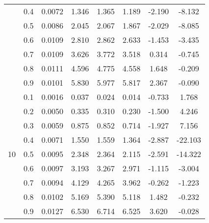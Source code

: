 \documentclass[11pt,a4paper]{report}
\begin{document}
\begin{longtable}{ | c | c || c | c | c | c | c | c | }
 & 0.4 & 0.0072 & 1.346 & 1.365 & 1.189 & -2.190 & -8.132 \\
 & 0.5 & 0.0086 & 2.045 & 2.067 & 1.867 & -2.029 & -8.085 \\
 & 0.6 & 0.0109 & 2.810 & 2.862 & 2.633 & -1.453 & -3.435 \\
 & 0.7 & 0.0109 & 3.626 & 3.772 & 3.518 & 0.314 & -0.745 \\
 & 0.8 & 0.0111 & 4.596 & 4.775 & 4.558 & 1.648 & -0.209 \\
 & 0.9 & 0.0101 & 5.830 & 5.977 & 5.817 & 2.367 & -0.090 \\
 \hline
\multirow{9}{*}{10} & 0.1 & 0.0016 & 0.037 & 0.024 & 0.014 & -0.733 & 1.768 \\
 & 0.2 & 0.0050 & 0.335 & 0.310 & 0.230 & -1.500 & 4.246 \\
 & 0.3 & 0.0059 & 0.875 & 0.852 & 0.714 & -1.927 & 7.156 \\
 & 0.4 & 0.0071 & 1.550 & 1.559 & 1.364 & -2.887 & -22.103 \\
 & 0.5 & 0.0095 & 2.348 & 2.364 & 2.115 & -2.591 & -14.322 \\
 & 0.6 & 0.0097 & 3.193 & 3.267 & 2.971 & -1.115 & -3.004 \\
 & 0.7 & 0.0094 & 4.129 & 4.265 & 3.962 & -0.262 & -1.223 \\
 & 0.8 & 0.0102 & 5.169 & 5.390 & 5.118 & 1.482 & -0.232 \\
 & 0.9 & 0.0127 & 6.530 & 6.714 & 6.525 & 3.620 & -0.028 \\
 \hline
\hline
\end{longtable}
\end{document}
